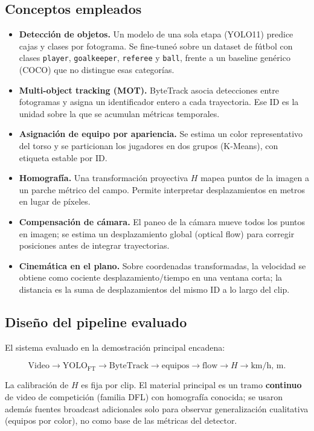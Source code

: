 \documentclass[conference]{IEEEtran}
\begin{document}
\subsection{Conceptos empleados}
\begin{itemize}[leftmargin=*,itemsep=2pt]
  \item \textbf{Detección de objetos.} Un modelo de una sola etapa (YOLO11) predice cajas y clases por fotograma. Se fine-tuneó sobre un dataset de fútbol con clases \texttt{player}, \texttt{goalkeeper}, \texttt{referee} y \texttt{ball}, frente a un baseline genérico (COCO) que no distingue esas categorías.
  \item \textbf{Multi-object tracking (MOT).} ByteTrack asocia detecciones entre fotogramas y asigna un identificador entero a cada trayectoria. Ese ID es la unidad sobre la que se acumulan métricas temporales.
  \item \textbf{Asignación de equipo por apariencia.} Se estima un color representativo del torso y se particionan los jugadores en dos grupos (K-Means), con etiqueta estable por ID.
  \item \textbf{Homografía.} Una transformación proyectiva $H$ mapea puntos de la imagen a un parche métrico del campo. Permite interpretar desplazamientos en metros en lugar de píxeles.
  \item \textbf{Compensación de cámara.} El paneo de la cámara mueve todos los puntos en imagen; se estima un desplazamiento global (optical flow) para corregir posiciones antes de integrar trayectorias.
  \item \textbf{Cinemática en el plano.} Sobre coordenadas transformadas, la velocidad se obtiene como cociente desplazamiento/tiempo en una ventana corta; la distancia es la suma de desplazamientos del mismo ID a lo largo del clip.
\end{itemize}

\subsection{Diseño del pipeline evaluado}
El sistema evaluado en la demostración principal encadena:

\begin{equation}
\text{Video}\!\rightarrow\!\text{YOLO}_{\text{FT}}\!\rightarrow\!\text{ByteTrack}\!\rightarrow\!\text{equipos}\!\rightarrow\!\text{flow}\!\rightarrow\!H\!\rightarrow\!\text{km/h, m.}
\label{eq:pipe}
\end{equation}

La calibración de $H$ es fija por clip. El material principal es un tramo \textbf{continuo} de video de competición (familia DFL) con homografía conocida; se usaron además fuentes broadcast adicionales solo para observar generalización cualitativa (equipos por color), no como base de las métricas del detector.
\end{document}
